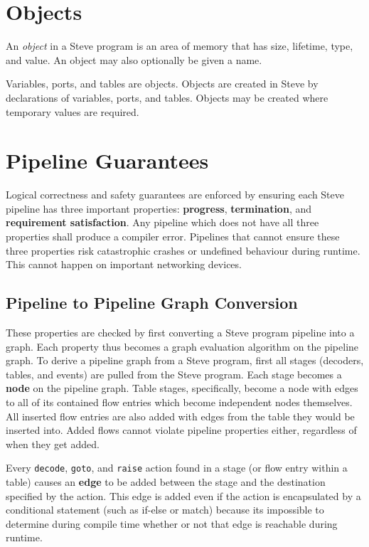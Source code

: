 \section{Objects} \label{object_guide}

An \textit{object} in a Steve program is an area of memory that has size, lifetime, type, and value. An object may also optionally be given a name.

Variables, ports, and tables are objects. Objects are created in Steve by declarations of variables, ports, and tables. Objects may be created where temporary values are required.

\section{Pipeline Guarantees} \label{pipeline_checking_guide}

Logical correctness and safety guarantees are enforced by ensuring each Steve pipeline has three important properties: \textbf{progress}, \textbf{termination}, and \textbf{requirement satisfaction}. Any pipeline which does not have all three properties shall produce a compiler error. Pipelines that cannot ensure these three properties risk catastrophic crashes or undefined behaviour during runtime. This cannot happen on important networking devices.

\subsection{Pipeline to Pipeline Graph Conversion} \label{pipeline_graph}

These properties are checked by first converting a Steve program pipeline into a graph. Each property thus becomes a graph evaluation algorithm on the pipeline graph. To derive a pipeline graph from a Steve program, first all stages (decoders, tables, and events) are pulled from the Steve program. Each stage becomes a \textbf{node} on the pipeline graph. Table stages, specifically, become a node with edges to all of its contained flow entries which become independent nodes themselves. All inserted flow entries are also added with edges from the table they would be inserted into. Added flows cannot violate pipeline properties either, regardless of when they get added.

Every \texttt{decode}, \texttt{goto}, and \texttt{raise} action found in a stage (or flow entry within a table) causes an \textbf{edge} to be added between the stage and the destination specified by the action. This edge is added even if the action is encapsulated by a conditional statement (such as if-else or match) because its impossible to determine during compile time whether or not that edge is reachable during runtime. 

